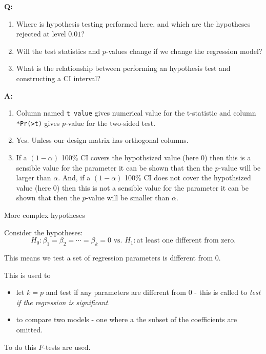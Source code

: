 \documentclass[10pt,ignorenonframetext,]{beamer}
\providecommand{\tightlist}{%
  \setlength{\itemsep}{0pt}\setlength{\parskip}{0pt}}
\begin{document}
\begin{frame}[fragile]

\textbf{Q:}

\begin{enumerate}
\def\labelenumi{\arabic{enumi}.}
\tightlist
\item
  Where is hypothesis testing performed here, and which are the
  hypotheses rejected at level \(0.01\)?
\item
  Will the test statistics and \(p\)-values change if we change the
  regression model?
\item
  What is the relationship between performing an hypothesis test and
  constructing a CI interval?
\end{enumerate}

\textbf{A:}

\begin{enumerate}
\def\labelenumi{\arabic{enumi}.}
\tightlist
\item
  Column named \texttt{t\ value} gives numerical value for the
  t-statistic and column
  \texttt{*Pr(\textgreater{}\textbar{}t\textbar{})} gives \(p\)-value
  for the two-sided test.
\item
  Yes. Unless our design matrix has orthogonal columns.
\item
  If a \((1-\alpha)\) 100\% CI covers the hypothsized value (here 0)
  then this is a sensible value for the parameter it can be shown that
  then the \(p\)-value will be larger than \(\alpha\). And, if a
  \((1-\alpha)\) 100\% CI does not cover the hypothsized value (here 0)
  then this is not a sensible value for the parameter it can be shown
  that then the \(p\)-value will be smaller than \(\alpha\).
\end{enumerate}

\end{frame}

\begin{frame}

\begin{block}{More complex hypotheses}

Consider the hypotheses:
\[ H_0: \beta_1=\beta_2=\cdots= \beta_k =0 \text{ vs. } H_1: \text{at least one different from zero}.\]

This means we test a set of regression parameters is different from 0.

This is used to

\begin{itemize}
\tightlist
\item
  let \(k=p\) and test if any parameters are different from 0 - this is
  called to \emph{test if the regression is significant}.
\item
  to compare two models - one where a the subset of the coefficients are
  omitted.
\end{itemize}

To do this \(F\)-tests are used.

\end{block}

\end{frame}
\end{document}
